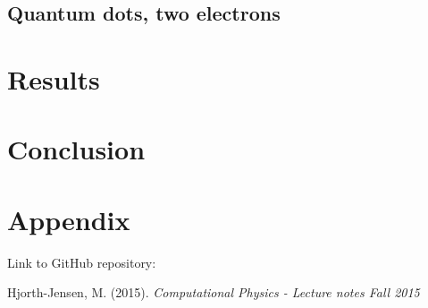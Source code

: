 \documentclass[12pt,a4paper,english]{article}
\begin{document}
\subsection{Quantum dots, two electrons}
\label{sect:quantum_two}
\section{Results}
\section{Conclusion}

\appendix
\section{Appendix}
\label{sect:appendix}
Link to GitHub repository:

\begin{thebibliography}{}
Hjorth-Jensen, M. (2015). \textit{Computational Physics - Lecture notes Fall 2015}
\end{thebibliography}
\end{document}
